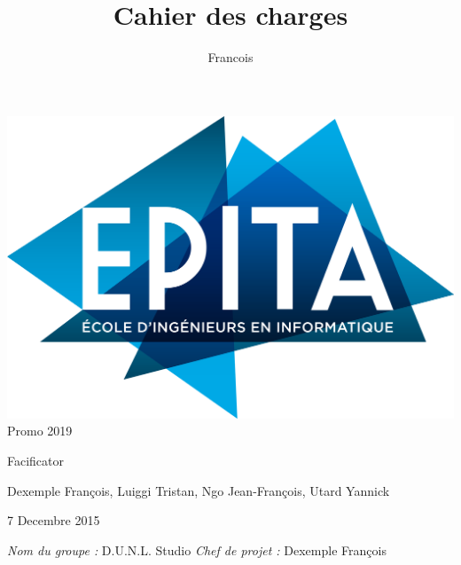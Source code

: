 \documentclass[12pt,a4paper]{article}
\author{Francois}
\title{Cahier des charges}
\begin{document}


\begin{titlepage}


\flushright \includegraphics[scale=.15]{Pictures/EPITA_LOGO_DEF.png}
\flushright Promo 2019



\begin{center}


\hspace{1.5cm}
{\Huge Facificator}
\newline
\newline
\newline
\newline
\newline

\end{center}
\begin{center}

\end{center}
\begin{Large}
\begin{center}
Dexemple François, Luiggi Tristan, 
Ngo Jean-François, Utard Yannick  \end{center}
\end{Large}
\vspace{.5cm}
\begin{center}
\begin{large}
7 Decembre 2015
\end{large}
\end{center}

\noindent
\newline
\newline
\textit{Nom du groupe :} D.U.N.L. Studio \newline 
\textit{Chef de projet :} Dexemple François \newline
\end{titlepage}
\newpage
\end{document}
